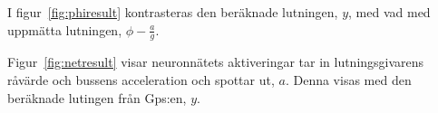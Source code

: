 I figur~\ref{fig:phiresult} kontrasteras den beräknade lutningen, $y$, med vad med
uppmätta lutningen, $ \phi - \frac{a}{g} $.

Figur~\ref{fig:netresult} visar neuronnätets aktiveringar tar in
lutningsgivarens råvärde och bussens acceleration
och spottar ut, $a$. Denna visas med den beräknade lutingen från Gps:en, $y$.
